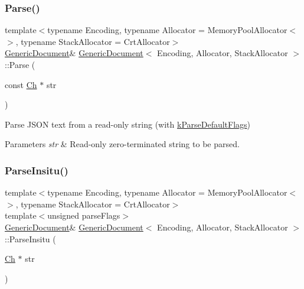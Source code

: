 \subsubsection{\texorpdfstring{Parse()}{Parse()}\hspace{0.1cm}{\footnotesize\ttfamily [3/3]}}
{\footnotesize\ttfamily template$<$typename Encoding, typename Allocator = Memory\+Pool\+Allocator$<$$>$, typename Stack\+Allocator = Crt\+Allocator$>$ \\
\hyperlink{a01996}{Generic\+Document}\& \hyperlink{a01996}{Generic\+Document}$<$ Encoding, Allocator, Stack\+Allocator $>$\+::Parse (\begin{DoxyParamCaption}\item[{const \hyperlink{a01992_ade0e0ce64ccd5d852da57a35e720bafb}{Ch} $\ast$}]{str }\end{DoxyParamCaption})\hspace{0.3cm}{\ttfamily [inline]}}



Parse J\+S\+ON text from a read-\/only string (with \hyperlink{a00563_ab7be7dabe6ffcba60fad441505583450a9104b0946d648e9467cb7a967401ec80}{k\+Parse\+Default\+Flags}) 


\begin{DoxyParams}{Parameters}
{\em str} & Read-\/only zero-\/terminated string to be parsed. \\
\hline
\end{DoxyParams}
\mbox{\label{a01996_a301f8f297a5a0da4b6be5459ad766f75}} 
\subsubsection{\texorpdfstring{Parse\+Insitu()}{ParseInsitu()}\hspace{0.1cm}{\footnotesize\ttfamily [1/2]}}
{\footnotesize\ttfamily template$<$typename Encoding, typename Allocator = Memory\+Pool\+Allocator$<$$>$, typename Stack\+Allocator = Crt\+Allocator$>$ \\
template$<$unsigned parse\+Flags$>$ \\
\hyperlink{a01996}{Generic\+Document}\& \hyperlink{a01996}{Generic\+Document}$<$ Encoding, Allocator, Stack\+Allocator $>$\+::Parse\+Insitu (\begin{DoxyParamCaption}\item[{\hyperlink{a01992_ade0e0ce64ccd5d852da57a35e720bafb}{Ch} $\ast$}]{str }\end{DoxyParamCaption})\hspace{0.3cm}{\ttfamily [inline]}}




